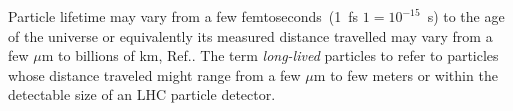 {%
Particle lifetime may vary from a few femtoseconds~(1~fs $1 = 10^{-15}$~s) to the age of the universe or equivalently 
its measured distance travelled  may vary from a few $\mu$m to billions of km, Ref.\cite{SM,SUSYBOOK}. 
The term \textit{long-lived} particles to refer to particles whose distance traveled
might range from a few $\mu$m to few meters or  within the detectable size of an LHC particle detector.


}
